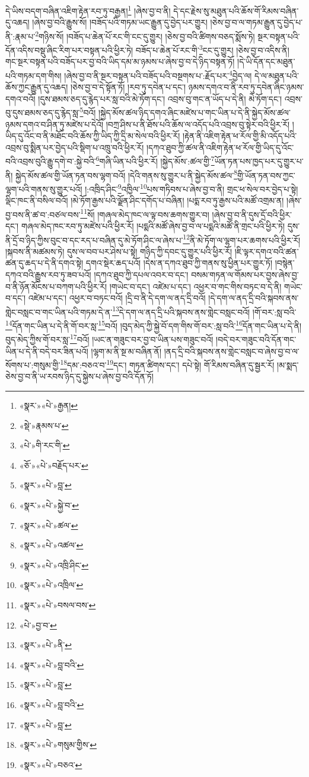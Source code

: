 དེ་ཡིས་བདག་བཞིན་འཇིག་རྟེན་རབ་ཏུ་བརྒྱན།\footnote{«སྣར་»«པེ་»རྒྱན།} །ཞེས་བྱ་བ་ནི། དེ་དང་རྗེས་སུ་མཐུན་པའི་ཆོས་གོ་རིམས་བཞིན་དུ་འཆད། །ཞེས་བྱ་བའི་རྒྱུས་སོ། །བཟོད་པའི་གཏམ་ཡང་རྒྱུན་དུ་བྱེད་པར་གྱུར། །ཅེས་བྱ་བ་ལ་གཏམ་རྒྱུན་དུ་བྱེད་པ་ནི་:རྣམ་པ་\footnote{«སྡེ་»རྣམས་པ་}གཉིས་སོ། །བཟོད་པ་ཆེན་པོ་རང་གི་ངང་དུ་གྱུར། །ཅེས་བྱ་བའི་ཚིགས་བཅད་སྨོས་ཏེ། སྔར་བསྟན་པའི་དོན་འདིས་བསྡུ་ཞིང་རིག་པར་བསྟན་པའི་ཕྱིར་ཏེ། བཟོད་པ་ཆེན་པོ་རང་གི་\footnote{«པེ་»གི་རང་གི་}ངང་དུ་གྱུར། །ཅེས་བྱ་བ་འདིས་ནི། གང་སྔར་བསྟན་པའི་བཟོད་པར་བྱ་བའི་ཡིད་དམ་མ་ཉམས་པ་ཞེས་བྱ་བ་དེ་ཉིད་བསྟན་ཏོ། །དེ་ཡི་དོན་དང་མཐུན་པའི་གཏམ་དག་གིས། །ཞེས་བྱ་བ་ནི་སྔར་བསྟན་པའི་བཟོད་པའི་བསྔགས་པ་:རྗོད་པར་\footnote{«ཅོ་»«པེ་»བརྗོད་པར་}བྱེད་ལ། དེ་ལ་མཐུན་པའི་ཆོས་ཀྱང་རྒྱུན་དུ་འཆད། །ཅེས་བྱ་བ་དེ་སྟོན་ཏོ། །རབ་ཏུ་དབེན་པ་དང་། ཉམས་དགའ་བ་ནི་རབ་ཏུ་དབེན་ཞིང་ཉམས་དགའ་བའོ། །དུས་ཐམས་ཅད་དུ་རྙེད་པར་སླ་བའི་མེ་ཏོག་དང་། འབྲས་བུ་གང་ན་ཡོད་པ་དེ་ནི། མེ་ཏོག་དང་། འབྲས་བུ་དུས་ཐམས་ཅད་དུ་རྙེད་སླ་\footnote{«སྣར་»«པེ་»བླ་}བའོ། །སྐྱེད་མོས་ཚལ་ཉིད་དགའ་ཞིང་མཛེས་པ་གང་ཡིན་པ་དེ་ནི་སྐྱེད་མོས་ཚལ་ཉམས་དགའ་བ་ཤིན་ཏུ་མཛེས་པ་དེའོ། །བཀྲ་ཤིས་པ་ནི་ཐོས་པའི་ཆོས་ལ་འདོད་པའི་འབྲས་བུ་སྟེར་བའི་ཕྱིར་རོ། །ཡིད་དུ་འོང་བ་ནི་མཐོང་བའི་ཆོས་ཀྱི་ཡིད་ཀྱི་དྲི་མ་སེལ་བའི་ཕྱིར་རོ། །རྟེན་ནི་འཇིག་རྟེན་ཕ་རོལ་གྱི་མི་འདོད་པའི་འབྲས་བུ་སྨིན་པར་བྱེད་པའི་སྡིག་པ་འཁྲུ་བའི་ཕྱིར་རོ། །དཀའ་ཐུབ་ཀྱི་ཚལ་ནི་འཇིག་རྟེན་ཕ་རོལ་གྱི་ཡིད་དུ་འོང་བའི་འབྲས་བུའི་རྒྱུ་དགེ་བ་:སྐྱེ་བའི་\footnote{«སྣར་»«པེ་»སྐྱེ་བ་}གཞི་ཡིན་པའི་ཕྱིར་རོ། །སྐྱེད་མོས་:ཚལ་གྱི་\footnote{«སྣར་»«པེ་»ཚལ་}ཡོན་ཏན་པས་ཁྱད་པར་དུ་གྱུར་པ་ནི། སྐྱེད་མོས་ཚལ་གྱི་ཡོན་ཏན་བས་ལྷག་བའོ། །དེའི་གནས་སུ་གྱུར་པ་ནི་སྐྱེད་མོས་ཚལ་\footnote{«སྣར་»«པེ་»འཚལ་}གྱི་ཡོན་ཏན་བས་ཀྱང་ལྷག་པའི་གནས་སུ་གྱུར་པའོ། །:འཁྲིད་ཤིང་\footnote{«སྣར་»«པེ་»འཁྲི་ཤིང་}འཁྱིལ་\footnote{«སྣར་»«པེ་»འཁྲིལ་}པས་གཏིབས་པ་ཞེས་བྱ་བ་ནི། གྲང་ཕ་སེལ་བར་བྱེད་པ་སྟེ། ལྡིང་ཁང་ནི་བསིལ་བའོ། །མེ་ཏོག་རྒྱས་པའི་ལྗོན་ཤིང་དགོད་པ་བཞིན། །པདྨ་རབ་ཏུ་རྒྱས་པའི་མཚོ་འགྲམ་ན། །ཞེས་བྱ་བས་ནི་ཚ་བ་:བཙལ་བས་\footnote{«སྣར་»«པེ་»བསལ་བས་}སོ། །གཞལ་མེད་ཁང་ལ་ལྟ་བས་ཆགས་གྱུར་བ། །ཞེས་བྱ་བ་ནི་དུས་དྲོ་བའི་ཕྱིར་དང་། གཞལ་མེད་ཁང་རབ་ཏུ་མཛེས་པའི་ཕྱིར་རོ། །པདྨའི་མཚོ་ཞེས་བྱ་བ་ལ་པདྨའི་མཚོ་ནི་གྲང་པའི་ཕྱིར་ཏེ། དུས་ནི་དྲོ་བ་ཉིད་ཀྱིས་བུང་བ་དང་རད་པ་བཞིན་དུ་མེ་ཏོག་ཤིང་ལ་ཞེས་པ་\footnote{«པེ་»བྱ་བ་}ནི་མེ་ཏོག་ལ་ལྷག་པར་ཆགས་པའི་ཕྱིར་རོ། །སྐབས་ནི་མཚམས་ཏེ། དུས་ལ་བབ་པར་ཤེས་པ་སྟེ། གཉིད་ཀྱི་དབང་དུ་གྱུར་པའི་ཕྱིར་རོ། །ཇི་ལྟར་དགའ་བའི་ཚན་ཚན་དུ་ཆད་པ་དེ་ནི་དགའ་སྟེ། དགའ་སྡེར་ཆད་པའོ། །དེས་ན་དཀའ་ཐུབ་ཀྱི་གནས་སུ་ཕྱིན་པར་གྱུར་ཏོ། །བསྙེན་དཀའ་བའི་རྒྱུས་རབ་ཏུ་ཟབ་པའོ། །དཀའ་ཐུབ་ཀྱི་དཔལ་འབར་བ་དང་། བསམ་གཏན་ལ་གོམས་པར་བྱས་ཞེས་བྱ་བ་ནི་ཉོན་མོངས་པ་བཀག་པའི་ཕྱིར་རོ། །གཡེང་བ་དང་། འཛེམ་པ་དང་། འཕྱར་བ་གང་གིས་བཏང་བ་དེ་ནི། གཡེང་བ་དང་། འཛེམ་པ་དང་། འཕྱར་བ་བཏང་བའོ། །དྲི་བ་ནི་དེ་དག་ལ་ནད་དྲི་བའོ། །དེ་དག་ལ་ནད་དྲི་བའི་སྐབས་ནས་གླེང་བསླང་བ་གང་ཡིན་པའི་གཏམ་དེ་ན་\footnote{«སྣར་»«པེ་»ནི་}དེ་དག་ལ་ནད་དྲི་པའི་སྐབས་ནས་གླེང་བསླང་བའོ། །གོ་བར་:སླ་བའི་\footnote{«སྣར་»«པེ་»བླ་བའི་}དོན་གང་ཡིན་པ་དེ་ནི་གོ་བར་སླ་\footnote{«སྣར་»«པེ་»བླ་}བའོ། །བུད་མེད་ཀྱི་སྐྱེ་བོ་དག་གིས་གོ་བར་:སླ་བའི་\footnote{«སྣར་»«པེ་»བླ་བའི་}དོན་གང་ཡིན་པ་དེ་ནི། བུད་མེད་ཀྱིས་གོ་བར་སླ་\footnote{«སྣར་»«པེ་»བླ་}བའོ། །ཡང་ན་གཟུང་བར་བྱ་བ་ཡིན་པས་གཟུང་བའོ། །བདེ་བར་གཟུང་བའི་དོན་གང་ཡིན་པ་དེ་ནི་བདེ་བར་ཟིན་པའོ། །ལྷག་མ་ནི་སྔ་མ་བཞིན་ནོ། །ནད་དྲི་བའི་སྐབས་ནས་གླེང་བསླང་བ་ཞེས་བྱ་བ་ལ་སོགས་པ་:གསུམ་གྱི་\footnote{«སྣར་»«པེ་»གསུམ་གྱིས་}དམ་:བཅའ་བ་\footnote{«སྣར་»«པེ་»བཅའ་}དང་། གཏན་ཚིགས་དང་། དཔེ་སྟེ། གོ་རིམས་བཞིན་དུ་སྦྱར་རོ། །མ་སྨད་ཅེས་བྱ་བ་ནི་ཡ་རབས་ཉིད་དུ་སྐྱེས་པ་ཞེས་བྱ་བའི་དོན་ཏོ། 